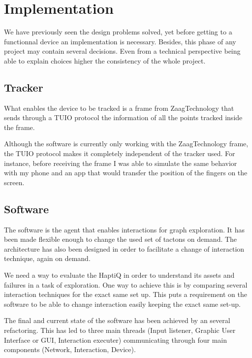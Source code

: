 \chapter{Implementation}

We have previously seen the design problems solved, yet before getting to a functionnal device an implementation is necessary. Besides, this phase of any project may contain several decisions. Even from a technical perspective being able to explain choices higher the consistency of the whole project.


\section{Tracker}\label{tracker}

What enables the device to be tracked is a frame from ZaagTechnology
that sends through a TUIO protocol the information of all the points
tracked inside the frame.

Although the software is currently only working with the ZaagTechnology
frame, the TUIO protocol makes it completely independent of the tracker
used. For instance, before receiving the frame I was able to simulate
the same behavior with my phone and an app that would transfer the position of the fingers on the screen.


\section{Software}\label{implementation-software}


The software is the agent that enables interactions for graph
exploration. It has been made flexible enough to change the used set of
tactons on demand. The architecture has also been designed in order to
facilitate a change of interaction technique, again on demand.

We need a way to evaluate the HaptiQ in order to understand its assets
and failures in a task of exploration. One way to achieve this is by
comparing several interaction techniques for the exact same set up. This
puts a requirement on the software to be able to change interaction
easily keeping the exact same set-up.

The final and current state of the software has been achieved by an
several refactoring. This has led to
three main threads (Input listener, Graphic User Interface or GUI,
Interaction executer) communicating through four main components
(Network, Interaction, Device).

